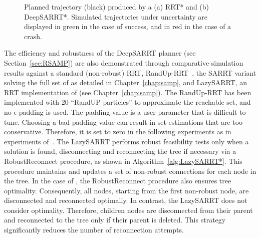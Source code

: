 \begin{figure} [h!]
    \centering
    \caption{Planned trajectory (black) produced by a (a) RRT* and (b) DeepSARRT*. 
    Simulated trajectories under uncertainty are displayed in green in the case of success, and in red in the case of a crash.}%
    \label{fig: simu window}%
\end{figure}

The efficiency and robustness of the DeepSARRT planner (see Section~\ref{sec:RSAMP}) are also demonstrated through comparative simulation results against a standard (non-robust) RRT, RandUp-RRT~\cite{cRandUpRRT}, the SARRT variant solving the full set of  as detailed in Chapter~\ref{chap:samp}, and LazySARRT, an RRT implementation of  (see Chapter~\ref{chap:samp}).
The RandUp-RRT has been implemented with 20 ``RandUP particles'' to approximate the reachable set, and no $\epsilon$-padding is used.
The padding value is a user parameter that is difficult to tune. 
Choosing a bad padding value can result in set estimations that are too conservative. 
Therefore, it is set to zero in the following experiments as in experiments of~\cite{cRandUpRRT}.
The LazySARRT performs robust feasibility tests only when a solution is found, disconnecting and reconnecting the tree if necessary via a RobustReconnect procedure, as shown in Algorithm~\ref{alg:LazySARRT*}. 
This procedure  maintains and updates a set of non-robust connections for each node in the tree. In the case of , the RobustReconnect procedure also ensures tree optimality. 
Consequently, all nodes, starting from the first non-robust node, are disconnected and reconnected optimally.
In contrast, the LazySARRT does not consider optimality. 
Therefore, children nodes are disconnected from their parent and reconnected to the tree only if their parent is deleted.
This strategy significantly reduces the number of reconnection attempts.

